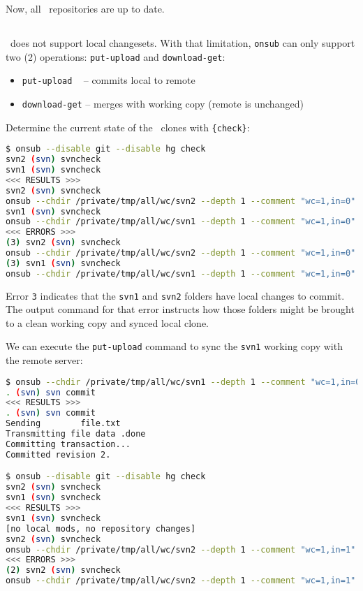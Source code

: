 Now, all \Mercurial\ repositories are up to date.

\subsection{\Subversion}

\Subversion\ does not support local changesets. With that limitation, \lstinline{onsub} can only support two (2) operations: \lstinline{put-upload} and \lstinline{download-get}:

\begin{itemize}
\item \lstinline{put-upload} ~ -- commits local to remote
\item \lstinline{download-get} -- merges with working copy (remote is unchanged)
\end{itemize}

Determine the current state of the \svn\ clones with \lstinline|{check}|:

\begin{snugshade}
\begin{lstlisting}[language=bash]	
$ onsub --disable git --disable hg check
svn2 (svn) svncheck
svn1 (svn) svncheck
<<< RESULTS >>>
svn2 (svn) svncheck
onsub --chdir /private/tmp/all/wc/svn2 --depth 1 --comment "wc=1,in=0" {put-upload}
svn1 (svn) svncheck
onsub --chdir /private/tmp/all/wc/svn1 --depth 1 --comment "wc=1,in=0" {put-upload}
<<< ERRORS >>>
(3) svn2 (svn) svncheck
onsub --chdir /private/tmp/all/wc/svn2 --depth 1 --comment "wc=1,in=0" {put-upload}
(3) svn1 (svn) svncheck
onsub --chdir /private/tmp/all/wc/svn1 --depth 1 --comment "wc=1,in=0" {put-upload}
\end{lstlisting}
\end{snugshade}

Error \lstinline{3} indicates that the \lstinline{svn1} and \lstinline{svn2} folders have local changes to commit. The output command for that error instructs how those folders might be brought to a clean working copy and synced local clone.

We can execute the \lstinline{put-upload} command to sync the \lstinline{svn1} working copy with the remote server:

\begin{snugshade}
\begin{lstlisting}[language=bash]	
$ onsub --chdir /private/tmp/all/wc/svn1 --depth 1 --comment "wc=1,in=0" {put-upload}
. (svn) svn commit
<<< RESULTS >>>
. (svn) svn commit
Sending        file.txt
Transmitting file data .done
Committing transaction...
Committed revision 2.

$ onsub --disable git --disable hg check
svn2 (svn) svncheck
svn1 (svn) svncheck
<<< RESULTS >>>
svn1 (svn) svncheck
[no local mods, no repository changes]
svn2 (svn) svncheck
onsub --chdir /private/tmp/all/wc/svn2 --depth 1 --comment "wc=1,in=1" {download-get}
<<< ERRORS >>>
(2) svn2 (svn) svncheck
onsub --chdir /private/tmp/all/wc/svn2 --depth 1 --comment "wc=1,in=1" {download-get}
\end{lstlisting}
\end{snugshade}

